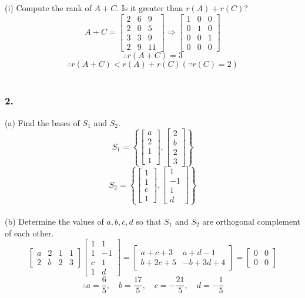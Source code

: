 (i) Compute the rank of $A+C$. Is it greater than $r(A) + r(C)$?
$$A+C=\begin{bmatrix}
    2&6&9\\2&0&5\\3&3&9\\2&9&11
\end{bmatrix}\Rightarrow\begin{bmatrix}
    1&0&0\\
    0&1&0\\
    0&0&1\\
    0&0&0
\end{bmatrix}$$
$$\therefore r(A+C) = 3$$
$$\therefore r(A+C) < r(A)+r(C) (\because r(C) = 2)$$\\

\subsubsection*{2.}
(a) Find the bases of $S_1$ and $S_2$.
$$S_1=\left\{\begin{bmatrix}
    a\\2\\1\\1
\end{bmatrix}, \begin{bmatrix}
    2\\b\\2\\3
\end{bmatrix}\right\}$$
$$S_2=\left\{\begin{bmatrix}
    1\\1\\c\\1
\end{bmatrix},\begin{bmatrix}
    1\\-1\\1\\d
\end{bmatrix}\right\}$$\\

(b) Determine the values of $a, b, c, d$ so that $S_1$ and $S_2$ are orthogonal complement of each other.
$$\begin{bmatrix}
        a&2&1&1\\
        2&b&2&3
    \end{bmatrix}\begin{bmatrix}
        1&1\\
        1&-1\\
        c&1\\
        1&d
    \end{bmatrix}=\begin{bmatrix}
        a+c+3&a+d-1\\
        b+2c+5&-b+3d+4
    \end{bmatrix}=\begin{bmatrix}
        0&0\\
        0&0
    \end{bmatrix}
$$
$$\therefore a=\frac{6}{5},\quad b=\frac{17}{5},\quad c=-\frac{21}{5},\quad d=-\frac{1}{5}$$
